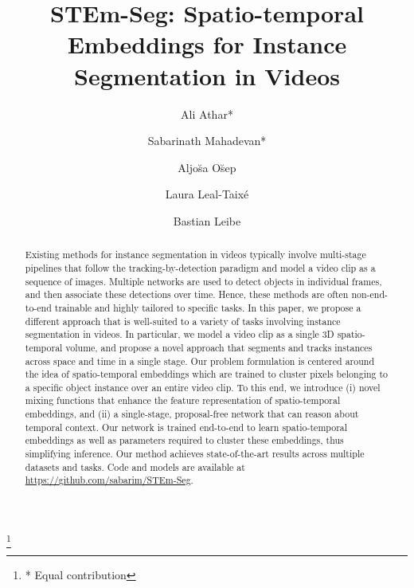 \documentclass[runningheads]{llncs}
\makeatletter
\newcommand*{\etal}{\emph{et al.}\@\xspace}
\makeatother
\begin{document}
\pagestyle{headings}
\mainmatter
\def\ECCVSubNumber{1299}

\newcommand\blfootnote[1]{\begingroup
  \renewcommand\thefootnote{}\footnote{#1}\addtocounter{footnote}{-1}\endgroup
}

\title{STEm-Seg: Spatio-temporal Embeddings for Instance Segmentation in Videos}

\author{Ali Athar* \and
Sabarinath Mahadevan* \and
Aljo\u{s}a O\u{s}ep  \and
Laura Leal-Taix\'{e}  \and
Bastian Leibe
}
\authorrunning{Athar, Mahadevan~\etal}


\maketitle

\blfootnote{* Equal contribution}
\begin{abstract}



Existing methods for instance segmentation in videos typically involve multi-stage pipelines that follow the tracking-by-detection paradigm and model a video clip as a sequence of images. 
Multiple networks are used to detect objects in individual frames, and then associate these detections over time.
Hence, these methods are often 
non-end-to-end trainable and highly tailored to specific tasks. 
In this paper, we propose a different approach that is well-suited to a variety of tasks involving instance segmentation in videos.
In particular, we model a video clip as a single 3D spatio-temporal volume, and propose a novel approach that segments and tracks instances across space and time in a single stage. 
Our problem formulation is centered around the idea of spatio-temporal embeddings which are trained to cluster pixels belonging to a specific object instance over an entire video clip.
To this end, we introduce (i) novel mixing functions that enhance the feature representation of spatio-temporal embeddings, and (ii) a single-stage, proposal-free network that can reason about temporal context. Our network is trained end-to-end to learn spatio-temporal embeddings as well as parameters required to cluster these embeddings, thus simplifying inference.
Our method achieves state-of-the-art results across multiple datasets and tasks. Code and models are available at \url{https://github.com/sabarim/STEm-Seg}. 














\end{abstract} 
\end{document}
